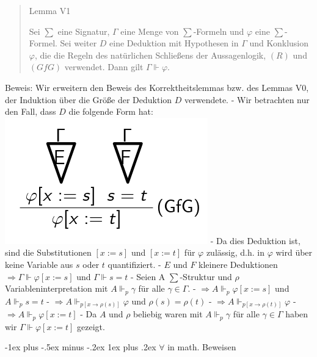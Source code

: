 \documentclass[a4paper]{article}
\makeatletter
\renewcommand{\subsubsection}{\@startsection{subsubsection}{3}{0mm}%
                {-1ex plus -.5ex minus -.2ex}%
                {1ex plus .2ex}%
                {\normalfont\small\bfseries}}
\makeatother
\begin{document}
\begin{multicols}{3}
  \begin{quote}
    Lemma V1

    Sei $\sum$ eine Signatur, $\Gamma$ eine Menge von $\sum$-Formeln und
    $\varphi$ eine $\sum$-Formel. Sei weiter $D$ eine Deduktion mit
    Hypothesen in $\Gamma$ und Konklusion $\varphi$, die die Regeln des
    natürlichen Schließens der Aussagenlogik, $(R)$ und $(GfG)$ verwendet.
    Dann gilt $\Gamma\Vdash\varphi$.
  \end{quote}

  Beweis: Wir erweitern den Beweis des Korrektheitslemmas bzw. des Lemmas
  V0, der Induktion über die Größe der Deduktion $D$ verwendete. - Wir
  betrachten nur den Fall, dass $D$ die folgende Form hat:
  \includegraphics[width=\linewidth]{Assets/Logik-lemma-v1-beweis.png} - Da dies Deduktion
  ist, sind die Substitutionen $[x:=s]$ und $[x:=t]$ für $\varphi$
  zulässig, d.h. in $\varphi$ wird über keine Variable aus $s$ oder $t$
  quantifiziert. - $E$ und $F$ kleinere Deduktionen
  $\Rightarrow\Gamma\Vdash\varphi[x:=s]$ und $\Gamma\Vdash s=t$ - Seien A
  $\sum$-Struktur und $\rho$ Variableninterpretation mit $A\Vdash_p\gamma$
  für alle $\gamma\in\Gamma$. - $\Rightarrow A\Vdash_p\varphi[x:=s]$ und
  $A\Vdash_p s=t$ - $\Rightarrow A\Vdash_{p[x\rightarrow \rho(s)]}\varphi$
  und $\rho(s) =\rho(t)$ -
  $\Rightarrow A\Vdash_{p[x\rightarrow \rho(t)]}\varphi$ -
  $\Rightarrow A\Vdash_p \varphi[x:=t]$ - Da $A$ und $\rho$ beliebig waren
  mit $A\Vdash_p\gamma$ für alle $\gamma\in\Gamma$ haben wir
  $\Gamma\Vdash\varphi[x:=t]$ gezeigt.

  \subsubsection{$\forall$ in math.
    Beweisen}\label{forall-in-math.-beweisen}


\end{multicols}
\end{document}
